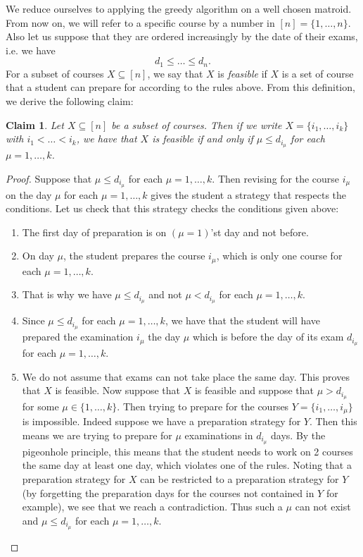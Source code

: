 \documentclass{article}
\newtheorem{claim}{Claim}[section]
\begin{document}
\begin{flushleft}
We reduce ourselves to applying the greedy algorithm on a well chosen matroid.
From now on, we will refer to a specific course by a number in $[n]=\{1,\ldots,n\}$.
Also let us suppose that they are ordered increasingly by the date of their exams, i.e. we have
\begin{equation*}
    d_1\leq\ldots\leq d_n.
\end{equation*}
For a subset of courses $X\subseteq[n]$, we say that $X$ is \emph{feasible} if $X$ is a set of course that a student can prepare for according to the rules above.
From this definition, we derive the following claim:
\begin{claim}
    Let $X\subseteq[n]$ be a subset of courses. Then if we write $X=\{i_1,\ldots,i_k\}$ with $i_1<\ldots<i_k$, we have that $X$ is feasible if and only if $\mu\leq d_{i_\mu}$ for each $\mu=1,\ldots,k$.
\end{claim}
\begin{proof}
    Suppose that $\mu\leq d_{i_\mu}$ for each $\mu=1,\ldots,k$. Then revising for the course $i_\mu$ on the day $\mu$ for each $\mu=1,\ldots,k$ gives the student a strategy that respects the conditions.
    Let us check that this strategy checks the conditions given above:
    \begin{enumerate}
        \item The first day of preparation is on $(\mu=1)$'st day and not before.
        \item On day $\mu$, the student prepares the course $i_\mu$, which is only one course for each $\mu=1,\ldots,k$.
        \item That is why we have $\mu\leq d_{i_\mu}$ and not $\mu<d_{i_\mu}$ for each $\mu=1,\ldots,k$.
        \item Since $\mu\leq d_{i_\mu}$ for each $\mu=1,\ldots,k$, we have that the student will have prepared the examination $i_\mu$ the day $\mu$ which is before the day of its exam $d_{i_\mu}$ for each $\mu=1,\ldots,k$.
        \item We do not assume that exams can not take place the same day.
    This proves that $X$ is feasible.
    Now suppose that $X$ is feasible and suppose that $\mu>d_{i_\mu}$ for some $\mu\in\{1,\ldots,k\}$.
    Then trying to prepare for the courses $Y=\{i_1,\ldots,i_\mu\}$ is impossible.
    Indeed suppose we have a preparation strategy for $Y$.
    Then this means we are trying to prepare for $\mu$ examinations in $d_{i_\mu}$ days. By the pigeonhole principle, this means that the student needs to work on 2 courses the same day at least one day, which violates one of the rules.
    Noting that a preparation strategy for $X$ can be restricted to a preparation strategy for $Y$ (by forgetting the preparation days for the courses not contained in $Y$ for example), we see that we reach a contradiction.
    Thus such a $\mu$ can not exist and $\mu\leq d_{i_\mu}$ for each $\mu=1,\ldots,k$.
    \end{enumerate}
\end{proof}


\end{flushleft}
\end{document}
